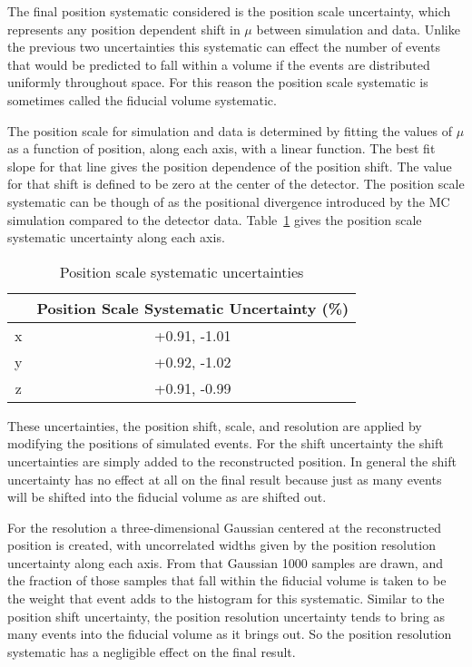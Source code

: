 The final position systematic considered is the position scale uncertainty,
which represents any position dependent shift in $\mu$ between simulation
and data. Unlike the previous two uncertainties this systematic can effect the
number of events that would be predicted to fall within a volume if the
events are distributed uniformly throughout space. For this reason the position
scale systematic is sometimes called the fiducial volume systematic.

The position scale for simulation and data is determined by fitting the values
of $\mu$ as a function of position, along each axis, with a linear function.
The best fit slope for that line gives the position dependence of the position
shift. The value for that shift is defined to be zero at the center
of the detector. The position scale systematic can be though of as the
positional divergence introduced by the MC simulation compared to the detector
data. Table~\ref{tbl:position_scale_systs} gives the position scale systematic
uncertainty along each axis.

\begin{table}
    \centering
    \begin{tabular}{|c|c|}
            \hline
            &Position Scale Systematic Uncertainty (\%)\\
            \hline
            x&+0.91, -1.01\\
            y&+0.92, -1.02\\
            z&+0.91, -0.99\\
            \hline
    \end{tabular}
    \caption{Position scale systematic uncertainties}
    \label{tbl:position_scale_systs}
\end{table}

These uncertainties, the position shift, scale, and resolution are applied
by modifying the positions of simulated events.
For the shift uncertainty the shift uncertainties are simply added to the reconstructed
position.
In general the shift uncertainty has no effect at all on the final result because
just as many events will be shifted into the fiducial volume as are shifted out.

For the resolution a three-dimensional Gaussian centered at the reconstructed
position is created,
with uncorrelated widths given by the position resolution uncertainty along each axis.
From that Gaussian 1000 samples are drawn, and the fraction of those samples
that fall within the fiducial volume is taken to be the weight
that event adds to the histogram for this systematic.
Similar to the position shift uncertainty, the position resolution uncertainty
tends to bring as many events into the fiducial volume as it brings out.
So the position resolution systematic has a negligible effect on the final result.

